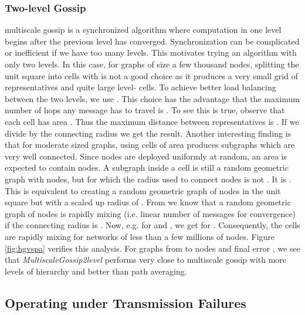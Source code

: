 \subsubsection*{Two-level Gossip} multiscale gossip is a synchronized algorithm where computation in one level begins after the previous level has converged. Synchronization can be complicated or inefficient if we have too many levels. This motivates trying an algorithm with only two levels. In this case, for graphs of size a few thousand nodes, splitting the unit square into  cells with  is not a good choice as it produces a very small grid of representatives and quite large level- cells. To achieve better load balancing between the two levels, we use . This choice has the advantage that the maximum number of hops any message has to travel is . To see this is true, observe that each  cell  has area . Thus the maximum distance between representatives is . If we divide by the connecting radius  we get the result. Another interesting finding is that for moderate sized graphs, using cells of area  produces subgraphs which are very well connected. Since nodes are deployed uniformly at random, an area  is expected to contain  nodes. A subgraph inside a   cell  is still a random geometric graph with  nodes, but for which the radius used to connect nodes is not . It is . This is equivalent to creating a random geometric graph of  nodes in the unit square but with a scaled up radius of . From \cite{cover_mixing_ran_geom_ercal_07} we know that a random geometric graph of  nodes is rapidly mixing (i.e. linear number of messages for convergence) if the connecting radius is . Now, e.g. for  and , we get   for . Consequently, the  cells are rapidly mixing for networks of less than a few millions of nodes. Figure \ref{fig:hgvspa} verifies this analysis. For graphs from  to  nodes and final error , we see that \textit{MultiscaleGossip2level} performs very close to multiscale gossip with more levels of hierarchy and better than path averaging.




\subsection{Operating under Transmission Failures}

